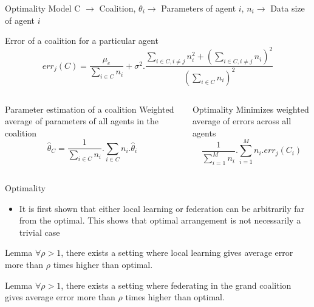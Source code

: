 \documentclass[aspectratio=169]{beamer}
\begin{document}
\begin{frame}[label={sec:org1044ef3}]{Optimality Model}
C \(\rightarrow\) Coalition, \(\theta_i \rightarrow\) Parameters of agent \(i\), \(n_i \rightarrow\) Data size of agent \(i\)

\begin{block}{Error of a coalition for a particular agent}
\[ err_j(C) = \frac{\mu_e}{\sum_{i \in C}n_i} + \sigma^2 . \frac{\sum_{i \in C, i \neq j} n_i^2 + \left( \sum_{i \in C, i \neq j} n_i \right)^2}{\left( \sum_{i \in C} n_i \right)^2}\]
\end{block}

\begin{columns}
\begin{column}{0.45\columnwidth}
\begin{block}{Parameter estimation of a coalition}
Weighted average of parameters of all agents in the coalition
 \[ \hat{\theta}_C = \frac{1}{\sum_{i \in C} n_i} . \sum_{i \in C} n_i . \hat{\theta}_i\]
\end{block}
\end{column}

\begin{column}{0.45\columnwidth}
\begin{block}{Optimality}
Minimizes weighted average of errors across all agents
\[ \frac{1}{\sum_{i=1}^M n_i} . \sum_{i=1}^M n_i . err_j(C_i) \]
\end{block}
\end{column}
\end{columns}
\end{frame}

\begin{frame}[label={sec:org8fa5023}]{Optimality}
\begin{itemize}
\item It is first shown that either local learning or federation can be arbitrarily far from the optimal. This shows that optimal arrangement is not necessarily a trivial case
\end{itemize}
\begin{block}{Lemma}
\(\forall \rho > 1\), there exists a setting where \alert{local learning} gives average error more than \(\rho\) times higher than optimal.
\end{block}

\begin{block}{Lemma}
\(\forall \rho > 1\), there exists a setting where \alert{federating in the grand coalition} gives average error more than \(\rho\) times higher than optimal.
\end{block}
\end{frame}
\end{document}

